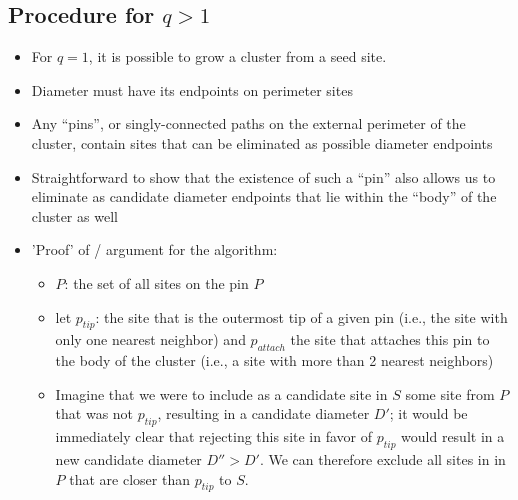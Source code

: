 \documentclass{umthesis}          %
\begin{document}
\subsection{Procedure for $q>1$}
\label{sec-4.2.4}

\begin{itemize}

\item For $q=1$, it is possible to grow a cluster from a seed site.\\
\label{sec-4.2.4.1}


\item Diameter must have its endpoints on perimeter sites\\
\label{sec-4.2.4.2}


\item Any ``pins'', or singly-connected paths on the external perimeter of the cluster, contain sites that can be eliminated as possible diameter endpoints\\
\label{sec-4.2.4.3}


\item Straightforward to show that the existence of such a ``pin'' also allows us to eliminate as candidate diameter endpoints that lie within the ``body'' of the cluster as well\\
\label{sec-4.2.4.4}


\item 'Proof' of / argument for the algorithm:\\
\label{sec-4.2.4.5}

\begin{itemize}

\item $P$: the set of all sites on the pin $P$\\
\label{sec-4.2.4.5.1}


\item let $p_{tip}$: the site that is the outermost tip of a given pin (i.e., the site with only one nearest neighbor) and $p_{attach}$ the site that attaches this pin to the body of the cluster (i.e., a site with more than 2 nearest neighbors)\\
\label{sec-4.2.4.5.2}


\item Imagine that we were to include as a candidate site in $S$ some site from $P$ that was not $p_{tip}$, resulting in a candidate diameter $D'$; it would be immediately clear that rejecting this site in favor of $p_{tip}$ would result in a new candidate diameter $D''>D'$.  We can therefore exclude all sites in in $P$ that are closer than $p_{tip}$ to $S$.\\
\label{sec-4.2.4.5.3}



\end{itemize}
\end{itemize}
\end{document}
